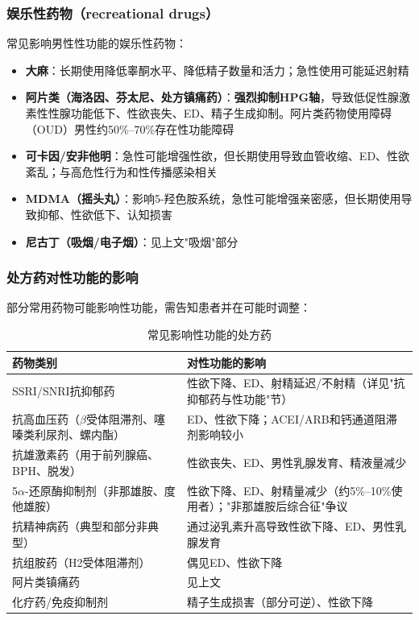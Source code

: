 \subsubsection{娱乐性药物（recreational drugs）}

常见影响男性性功能的娱乐性药物：

\begin{itemize}[leftmargin=2cm]
	\item \textbf{大麻}：长期使用降低睾酮水平、降低精子数量和活力；急性使用可能延迟射精
	\item \textbf{阿片类（海洛因、芬太尼、处方镇痛药）}：\textbf{强烈抑制HPG轴}，导致低促性腺激素性性腺功能低下、性欲丧失、ED、精子生成抑制。阿片类药物使用障碍（OUD）男性约50\%--70\%存在性功能障碍
	\item \textbf{可卡因/安非他明}：急性可能增强性欲，但长期使用导致血管收缩、ED、性欲紊乱；与高危性行为和性传播感染相关
	\item \textbf{MDMA（摇头丸）}：影响5-羟色胺系统，急性可能增强亲密感，但长期使用导致抑郁、性欲低下、认知损害
	\item \textbf{尼古丁（吸烟/电子烟）}：见上文"吸烟"部分
\end{itemize}

\subsubsection{处方药对性功能的影响}

部分常用药物可能影响性功能，需告知患者并在可能时调整：

\begin{table}[htbp]
\centering
\caption{常见影响性功能的处方药}
\label{tab:drug_sexual_effects}
\begin{tabularx}{\textwidth}{@{}lX@{}}
    \toprule
    \textbf{药物类别} & \textbf{对性功能的影响} \\
    \midrule
    SSRI/SNRI抗抑郁药 & 性欲下降、ED、射精延迟/不射精（详见"抗抑郁药与性功能"节） \\
    抗高血压药（$\beta$受体阻滞剂、噻嗪类利尿剂、螺内酯） & ED、性欲下降；ACEI/ARB和钙通道阻滞剂影响较小 \\
    抗雄激素药（用于前列腺癌、BPH、脱发） & 性欲丧失、ED、男性乳腺发育、精液量减少 \\
    5$\alpha$-还原酶抑制剂（非那雄胺、度他雄胺） & 性欲下降、ED、射精量减少（约5\%--10\%使用者）；"非那雄胺后综合征"争议 \\
    抗精神病药（典型和部分非典型） & 通过泌乳素升高导致性欲下降、ED、男性乳腺发育 \\
    抗组胺药（H2受体阻滞剂） & 偶见ED、性欲下降 \\
    阿片类镇痛药 & 见上文 \\
    化疗药/免疫抑制剂 & 精子生成损害（部分可逆）、性欲下降 \\
    \bottomrule
\end{tabularx}
\end{table}

